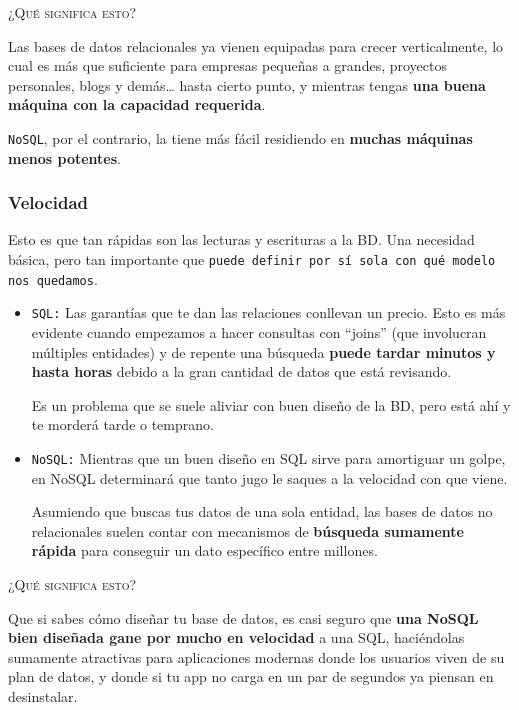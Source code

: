 \textsc{¿Qué significa esto?}

Las bases de datos relacionales ya vienen equipadas para crecer verticalmente, lo cual es más que suficiente para empresas pequeñas a grandes, proyectos personales, blogs y demás… hasta cierto punto, y mientras tengas \textbf{una buena máquina con la capacidad requerida}.

\texttt{NoSQL}, por el contrario, la tiene más fácil residiendo en \textbf{muchas máquinas menos potentes}.

\subsubsection*{Velocidad}

Esto es que tan rápidas son las lecturas y escrituras a la BD. Una necesidad básica, pero tan importante que \texttt{puede definir por sí sola con qué modelo nos quedamos}.

\begin{itemize}


\item \texttt{SQL:} Las garantías que te dan las relaciones conllevan un precio. Esto es más evidente cuando empezamos a hacer consultas con “joins” (que involucran múltiples entidades) y de repente una búsqueda \textbf{puede tardar minutos y hasta horas} debido a la gran cantidad de datos que está revisando.

Es un problema que se suele aliviar con buen diseño de la BD, pero está ahí y te morderá tarde o temprano.

\item \texttt{NoSQL:} Mientras que un buen diseño en SQL sirve para amortiguar un golpe, en NoSQL determinará que tanto jugo le saques a la velocidad con que viene.

Asumiendo que buscas tus datos de una sola entidad, las bases de datos no relacionales suelen contar con mecanismos de \textbf{búsqueda sumamente rápida} para conseguir un dato específico entre millones.

\end{itemize}

\textsc{¿Qué significa esto?}

Que si sabes cómo diseñar tu base de datos, es casi seguro que \textbf{una NoSQL bien diseñada gane por mucho en velocidad} a una SQL, haciéndolas sumamente atractivas para aplicaciones modernas donde los usuarios viven de su plan de datos, y donde si tu app no carga en un par de segundos ya piensan en desinstalar.

